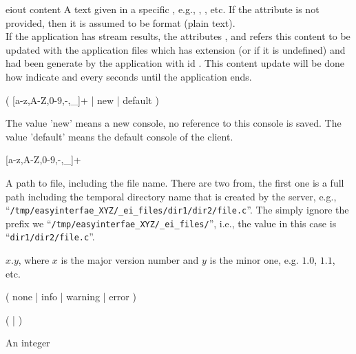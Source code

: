 \bigskip
\xmlstruct
{eiout}
{content}
{%
%
  A text given in a specific , e.g.,
  , , etc. If the
  attribute  is not provided, then it is assumed
  to be  format (plain text).\\
%
  If the application has stream results, the attributes
  ,  and
   refers this content to be updated with
  the application files which has extension 
  (or  if it is undefined) and had been generate by the
  application with id  . This content update
  will be done how  indicate and every
   seconds until the application ends. 
%
}

\bigskip
\noindent
{}

( [a-z,A-Z,0-9,-,\_]+ | new | default )

\medskip
\noindent
The value 'new' means a new console, no reference to this console is
saved. The value 'default' means the default console of the client.


\bigskip
\noindent
{}

 [a-z,A-Z,0-9,-,\_]+

\bigskip
\noindent
{}

\noindent
A path to file, including the file name. There are two from, the first
one is a full path including the temporal directory name that is
created by the server, e.g.,
``\texttt{/tmp/easyinterfae\_XYZ/\_ei\_files/dir1/dir2/file.c}''. The
simply ignore the prefix we
``\texttt{/tmp/easyinterfae\_XYZ/\_ei\_files/}'', i.e., the value in
this case is ``\texttt{dir1/dir2/file.c}''.

\bigskip
\noindent
{}

$x.y$, where $x$ is the major version number and $y$ is the minor one,
e.g. $1.0$, $1.1$, etc.

\bigskip
\noindent
{}

( none | info | warning | error )

\bigskip
\noindent
{}

(  |  )

\bigskip
\noindent
{}

An integer


